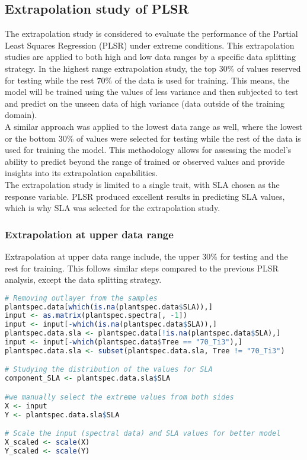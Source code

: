 \documentclass[12pt,a4paper]{report}
\begin{document}
\subsection{Extrapolation study of PLSR}
The extrapolation study is considered to evaluate the performance of the Partial Least Squares Regression (PLSR) under extreme conditions. This extrapolation studies are applied to both high and low data ranges by a specific data splitting strategy. In the highest range extrapolation study, the top $30\%$ of values reserved for testing while the rest $70\%$ of the data is used for training. This means, the model will be trained using the values of less variance and then subjected to test and predict on the unseen data of high variance (data outside of the training domain).\\

A similar approach was applied to the lowest data range as well, where the lowest or the bottom $30\%$ of values were selected for testing while the rest of the data is used for training the model. This methodology allows for assessing the model's ability to predict beyond the range of trained or observed values and provide insights into its extrapolation capabilities.\\

The extrapolation study is limited to a single trait, with SLA chosen as the response variable. PLSR produced excellent results in predicting SLA values, which is why SLA was selected for the extrapolation study.

\subsubsection*{Extrapolation at upper data range}
Extrapolation at upper data range include, the upper $30\%$ for testing and the rest for training. This follows similar steps compared to the previous PLSR analysis, except the data splitting strategy.\\ 

\begin{lstlisting}[language=R, style=mystyle]
# Removing outlayer from the samples
plantspec.data[which(is.na(plantspec.data$SLA)),]
input <- as.matrix(plantspec.spectra[, -1])
input <- input[-which(is.na(plantspec.data$SLA)),]
plantspec.data.sla <- plantspec.data[!is.na(plantspec.data$SLA),]
input <- input[-which(plantspec.data$Tree == "70_Ti3"),]
plantspec.data.sla <- subset(plantspec.data.sla, Tree != "70_Ti3")

# Studying the distribution of the values for SLA
component_SLA <- plantspec.data.sla$SLA

#we manually select the extreme values from both sides
X <- input  
Y <- plantspec.data.sla$SLA  

# Scale the input (spectral data) and SLA values for better model
X_scaled <- scale(X)            
Y_scaled <- scale(Y)
\end{lstlisting}
\end{document}

